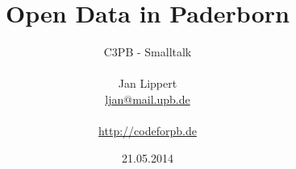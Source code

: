 \documentclass[10pt,a4paper]{beamer}
\author{C3PB - Smalltalk\\
~\\
Jan Lippert\\
\href{mailto:ljan@mail.upb.de?subject=[Open Data]}{ljan@mail.upb.de}\\
~\\
\href{http://codeforpb.de}{http://codeforpb.de}}
\title{Open Data in Paderborn}
\date{21.05.2014}
\begin{document}
\begin{frame}
\titlepage
\end{frame}

%





%
\end{document}
